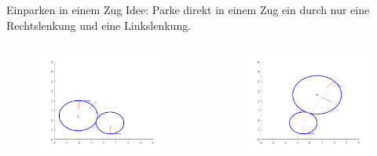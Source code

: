 \begin{frame}{Einparken in einem Zug}
Idee: Parke direkt in einem Zug ein durch nur eine Rechtslenkung und eine Linkslenkung.

	\begin{columns}
		\begin{column}{0.5\textwidth}
			\begin{figure}
				\centering
				\includegraphics[width=\textwidth]{images/ex2step3example1.png}
			\end{figure}
		\end{column}
		\begin{column}{0.5\textwidth}
			\begin{figure}
				\centering
				\includegraphics[width=\textwidth]{images/ex2step3example2.png}
			\end{figure}
		\end{column}
	\end{columns}
\end{frame}